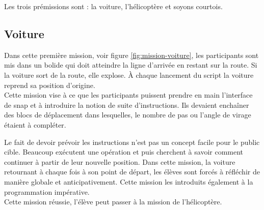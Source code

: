 Les trois prémissions sont : la voiture, l'hélicoptère et soyons courtois.


%

\subsection{Voiture}
\label{mission-voiture}
Dans cette première \gls{mission}, voir figure \ref{fig:mission-voiture}, les participants sont mis dans un bolide qui doit atteindre la ligne d'arrivée en restant sur la route. Si la voiture sort de la route, elle explose. À chaque lancement du \gls{script} la voiture reprend sa position d'origine.\\

Cette \gls{mission} vise à ce que les participants puissent prendre en main l'interface de \gls{snap} et à introduire la notion de suite d'instructions. Ils devaient enchaîner des \glspl{bloc} de déplacement dans lesquelles, le nombre de pas ou l'angle de virage étaient à compléter.

Le fait de devoir prévoir les instructions n'est pas un concept facile pour le public cible. Beaucoup exécutent une opération et puis cherchent à savoir comment continuer à partir de leur nouvelle position. Dans cette \gls{mission}, la voiture retournant à chaque fois à son point de départ, les élèves sont forcés à réfléchir de manière globale et anticipativement. Cette \gls{mission} les introduits également à la programmation impérative.\\

Cette \gls{mission} réussie, l'élève peut passer à la \gls{mission} de l'hélicoptère.

